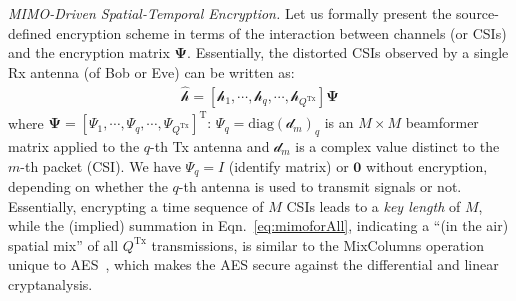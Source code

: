 \documentclass[conference,compsoc]{IEEEtran}
\newcommand{\rev}[1]{{\color{blue}#1}}      %
\newcommand{\newrev}[1]{{\color{blue}#1}}    %
\newcommand{\rev}[1]{#1}
\newcommand{\newrev}[1]{#1}
\begin{document}
\emph{MIMO-Driven Spatial-Temporal Encryption.}
%
Let us formally present the source-defined encryption scheme in terms of the interaction between channels (or CSIs) and the encryption matrix $\bm{\Psi}$. Essentially, the distorted CSIs observed by a single Rx antenna (of Bob or Eve) can be written as:
%
\begin{align} \label{eq:mimoforAll}
\hat{\bm{\mathcal{h}}} =  \left[\bm{\mathcal{h}}_1, \cdots, \bm{\mathcal{h}}_q, \cdots, \bm{\mathcal{h}}_{Q^{\mathrm{Tx}}} \right] \bm{\Psi} 
\end{align}
where \newrev{$\bm{\Psi} = [\Psi_1, \cdots, \Psi_q, \cdots, \Psi_{Q^{\mathrm{Tx}}}]^{\mathrm{T}}$: $\Psi_q = \mathrm{diag}(\mathcal{d}_m)_q$ is an $M \times M$ beamformer matrix applied to the $q$-th Tx antenna and $\mathcal{d}_m$ is a complex value distinct to the $m$-th packet (CSI). We have $\Psi_q = I$ (identify matrix) or $\bm{0}$ without encryption, depending on whether the $q$-th antenna is used to transmit signals or not.
%
Essentially, encrypting a time sequence of $M$ CSIs leads to a \textit{key length} of $M$, while the (implied) summation in Eqn.~\eqref{eq:mimoforAll}, indicating a ``(in the air) spatial mix'' of all $Q^{\mathrm{Tx}}$ transmissions, is similar to the MixColumns operation unique to AES~\cite{heron2009advanced}, which makes the AES secure against the differential and linear cryptanalysis.}
%
%
\end{document}
